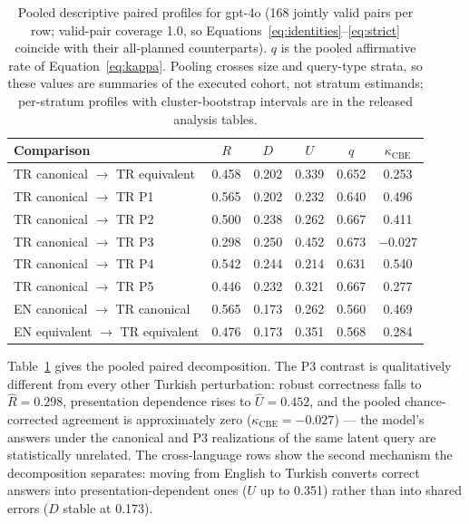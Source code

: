 \begin{table}[t]
  \centering
  \caption{Pooled descriptive paired profiles for gpt-4o (168 jointly valid pairs per row; valid-pair
  coverage 1.0, so Equations~\eqref{eq:identities}--\eqref{eq:strict} coincide with their all-planned
  counterparts). $q$ is the pooled affirmative rate of Equation~\eqref{eq:kappa}. Pooling crosses size and
  query-type strata, so these values are summaries of the executed cohort, not stratum estimands;
  per-stratum profiles with cluster-bootstrap intervals are in the released analysis tables.}
  \label{tab:pilotprofiles}
  \small
  \begin{tabular}{@{}lccccc@{}}
    \toprule
    Comparison & $R$ & $D$ & $U$ & $q$ & $\kappa_{\mathrm{CBE}}$ \\
    \midrule
    TR canonical $\to$ TR equivalent & 0.458 & 0.202 & 0.339 & 0.652 & 0.253 \\
    TR canonical $\to$ TR P1         & 0.565 & 0.202 & 0.232 & 0.640 & 0.496 \\
    TR canonical $\to$ TR P2         & 0.500 & 0.238 & 0.262 & 0.667 & 0.411 \\
    TR canonical $\to$ TR P3         & 0.298 & 0.250 & 0.452 & 0.673 & $-0.027$ \\
    TR canonical $\to$ TR P4         & 0.542 & 0.244 & 0.214 & 0.631 & 0.540 \\
    TR canonical $\to$ TR P5         & 0.446 & 0.232 & 0.321 & 0.667 & 0.277 \\
    EN canonical $\to$ TR canonical  & 0.565 & 0.173 & 0.262 & 0.560 & 0.469 \\
    EN equivalent $\to$ TR equivalent & 0.476 & 0.173 & 0.351 & 0.568 & 0.284 \\
    \bottomrule
  \end{tabular}
\end{table}

Table~\ref{tab:pilotprofiles} gives the pooled paired decomposition. The P3 contrast is qualitatively
different from every other Turkish perturbation: robust correctness falls to $\widehat{R} = 0.298$,
presentation dependence rises to $\widehat{U} = 0.452$, and the pooled chance-corrected agreement is
approximately zero ($\kappa_{\mathrm{CBE}} = -0.027$) --- the model's answers under the canonical and P3
realizations of the same latent query are statistically unrelated. The cross-language rows show the second
mechanism the decomposition separates: moving from English to Turkish converts correct answers into
presentation-dependent ones ($U$ up to 0.351) rather than into shared errors ($D$ stable at 0.173).

